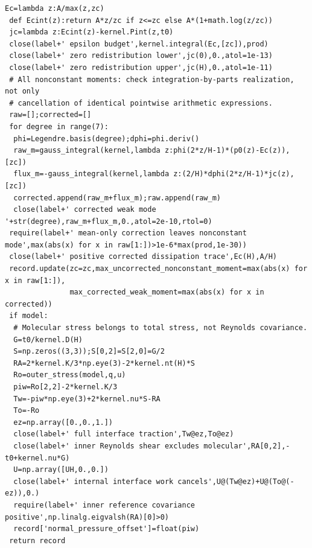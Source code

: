 \documentclass[11pt,a4paper]{article}
\numberwithin{equation}{section}
\begin{document}
\begin{lstlisting}[caption={Standalone wall-equation and coefficient-consistency checks.}]
 Ec=lambda z:A/max(z,zc)
 def Ecint(z):return A*z/zc if z<=zc else A*(1+math.log(z/zc))
 jc=lambda z:Ecint(z)-kernel.Pint(z,t0)
 close(label+' epsilon budget',kernel.integral(Ec,[zc]),prod)
 close(label+' zero redistribution lower',jc(0),0.,atol=1e-13)
 close(label+' zero redistribution upper',jc(H),0.,atol=1e-11)
 # All nonconstant moments: check integration-by-parts realization, not only
 # cancellation of identical pointwise arithmetic expressions.
 raw=[];corrected=[]
 for degree in range(7):
  phi=Legendre.basis(degree);dphi=phi.deriv()
  raw_m=gauss_integral(kernel,lambda z:phi(2*z/H-1)*(p0(z)-Ec(z)),[zc])
  flux_m=-gauss_integral(kernel,lambda z:(2/H)*dphi(2*z/H-1)*jc(z),[zc])
  corrected.append(raw_m+flux_m);raw.append(raw_m)
  close(label+' corrected weak mode '+str(degree),raw_m+flux_m,0.,atol=2e-10,rtol=0)
 require(label+' mean-only correction leaves nonconstant mode',max(abs(x) for x in raw[1:])>1e-6*max(prod,1e-30))
 close(label+' positive corrected dissipation trace',Ec(H),A/H)
 record.update(zc=zc,max_uncorrected_nonconstant_moment=max(abs(x) for x in raw[1:]),
               max_corrected_weak_moment=max(abs(x) for x in corrected))
 if model:
  # Molecular stress belongs to total stress, not Reynolds covariance.
  G=t0/kernel.D(H)
  S=np.zeros((3,3));S[0,2]=S[2,0]=G/2
  RA=2*kernel.K/3*np.eye(3)-2*kernel.nt(H)*S
  Ro=outer_stress(model,q,u)
  piw=Ro[2,2]-2*kernel.K/3
  Tw=-piw*np.eye(3)+2*kernel.nu*S-RA
  To=-Ro
  ez=np.array([0.,0.,1.])
  close(label+' full interface traction',Tw@ez,To@ez)
  close(label+' inner Reynolds shear excludes molecular',RA[0,2],-t0+kernel.nu*G)
  U=np.array([UH,0.,0.])
  close(label+' internal interface work cancels',U@(Tw@ez)+U@(To@(-ez)),0.)
  require(label+' inner reference covariance positive',np.linalg.eigvalsh(RA)[0]>0)
  record['normal_pressure_offset']=float(piw)
 return record


\end{lstlisting}
\end{document}
